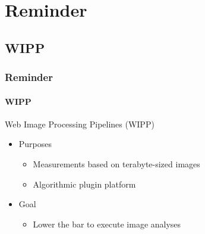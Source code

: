\def\sectiontitle{Reminder}

\section{\sectiontitle}

\def\slidetitle{WIPP}

\subsection{\slidetitle}
\begin{frame}
  \frametitle{\sectiontitle}
  \framesubtitle{\slidetitle}

  \begin{minipage}[h!]{0.60\textwidth}
    Web Image Processing Pipelines (WIPP)
    \begin{itemize}
      \item Purposes
      \begin{itemize}
        \item Measurements based on terabyte-sized images
        \item Algorithmic plugin platform
      \end{itemize}
      \item Goal
      \begin{itemize}
        \item Lower the bar to execute image analyses
      \end{itemize}
    \end{itemize}
  \end{minipage}\hfill
  \begin{minipage}[h!]{0.35\textwidth}

\end{minipage}
\end{frame}
